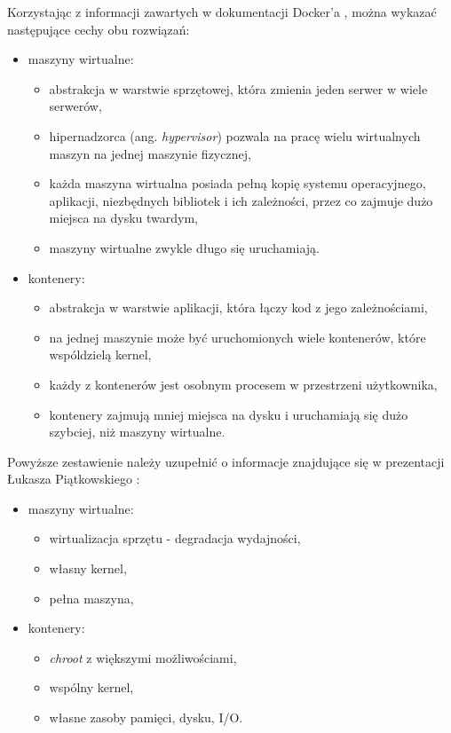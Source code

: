 \documentclass[mgr,oneside]{mgr}
\begin{document}
Korzystając z informacji zawartych w dokumentacji Docker'a \cite{docker_what_container}, można wykazać następujące cechy obu rozwiązań:

\begin{itemize}
  \item maszyny wirtualne:
  \begin{itemize}
    \item abstrakcja w warstwie sprzętowej, która zmienia jeden serwer w wiele serwerów,
    \item hipernadzorca (ang. \textit{hypervisor}) pozwala na pracę wielu wirtualnych maszyn na jednej maszynie fizycznej,
    \item każda maszyna wirtualna posiada pełną kopię systemu operacyjnego, aplikacji, niezbędnych bibliotek i ich zależności, przez co zajmuje dużo miejsca na dysku twardym,
    \item maszyny wirtualne zwykle długo się uruchamiają.
  \end{itemize}

  \item kontenery:
  \begin{itemize}
    \item abstrakcja w warstwie aplikacji, która łączy kod z jego zależnościami,
    \item na jednej maszynie może być uruchomionych wiele kontenerów, które wspóldzielą kernel,
    \item każdy z kontenerów jest osobnym procesem w przestrzeni użytkownika,
    \item kontenery zajmują mniej miejsca na dysku i uruchamiają się dużo szybciej, niż maszyny wirtualne.
  \end{itemize}
\end{itemize}

Powyższe zestawienie należy uzupełnić o informacje znajdujące się w prezentacji Łukasza Piątkowskiego \cite{docker_prez}:
\begin{itemize}
  \item maszyny wirtualne:
  \begin{itemize}
    \item wirtualizacja sprzętu - degradacja wydajności,
    \item własny kernel,
    \item pełna maszyna,
  \end{itemize}

  \item kontenery:
  \begin{itemize}
    \item \textit{chroot} z większymi możliwościami,
    \item wspólny kernel,
    \item własne zasoby pamięci, dysku, I/O.
  \end{itemize}
\end{itemize}
\end{document}
